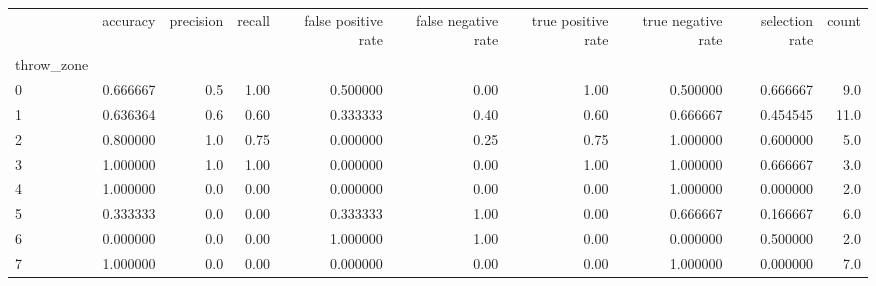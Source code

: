 \begin{tabular}{lrrrrrrrrr}
\toprule
{} &  accuracy &  precision &  recall &  false positive rate &  false negative rate &  true positive rate &  true negative rate &  selection rate &  count \\
throw\_zone &           &            &         &                      &                      &                     &                     &                 &        \\
\midrule
0          &  0.666667 &        0.5 &    1.00 &             0.500000 &                 0.00 &                1.00 &            0.500000 &        0.666667 &    9.0 \\
1          &  0.636364 &        0.6 &    0.60 &             0.333333 &                 0.40 &                0.60 &            0.666667 &        0.454545 &   11.0 \\
2          &  0.800000 &        1.0 &    0.75 &             0.000000 &                 0.25 &                0.75 &            1.000000 &        0.600000 &    5.0 \\
3          &  1.000000 &        1.0 &    1.00 &             0.000000 &                 0.00 &                1.00 &            1.000000 &        0.666667 &    3.0 \\
4          &  1.000000 &        0.0 &    0.00 &             0.000000 &                 0.00 &                0.00 &            1.000000 &        0.000000 &    2.0 \\
5          &  0.333333 &        0.0 &    0.00 &             0.333333 &                 1.00 &                0.00 &            0.666667 &        0.166667 &    6.0 \\
6          &  0.000000 &        0.0 &    0.00 &             1.000000 &                 1.00 &                0.00 &            0.000000 &        0.500000 &    2.0 \\
7          &  1.000000 &        0.0 &    0.00 &             0.000000 &                 0.00 &                0.00 &            1.000000 &        0.000000 &    7.0 \\
\bottomrule
\end{tabular}
